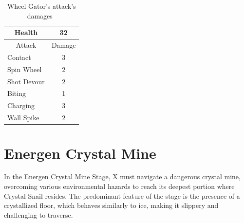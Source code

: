 \begin{table}[htp]
	\centering
	\begin{tabular}[h]{l c}
		\toprule
		\multicolumn{1}{c}{Health}  & 32 \\
		\midrule
		\multicolumn{1}{c}{Attack} & \multicolumn{1}{c}{Damage}\\
		Contact & 3 \\
		Spin Wheel & 2\\
		Shot Devour & 2\\
		Biting & 1\\
		Charging& 3\\
		Wall Spike& 2\\
		\bottomrule
	\end{tabular}
	\caption{Wheel Gator's attack's damages~\cite{wiki:Wheel_gator,book:Compendium}}
\end{table}

\section{Energen Crystal Mine}
In the Energen Crystal Mine Stage, X must navigate a dangerous crystal mine, overcoming various environmental hazards to reach its deepest portion where Crystal Snail resides. The predominant feature of the stage is the presence of a crystallized floor, which behaves similarly to ice, making it slippery and challenging to traverse.

